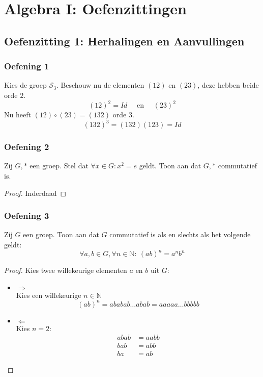 \documentclass[main.tex]{subfiles}
\begin{document}
\chapter{Algebra I: Oefenzittingen}
\label{cha:algebra-i-oefenzittingen}

\section{Oefenzitting 1: Herhalingen en Aanvullingen}
\subsection*{Oefening 1}
\label{oza:oz1-oef1}
Kies de groep $\mathcal{S}_{3}$.
Beschouw nu de elementen $(12)$ en $(23)$, deze hebben beide orde $2$.
\[ (12)^{2} = Id \quad\text{ en }\quad (23)^{2} \]
Nu heeft $(12) \circ (23) = (132)$ orde $3$.
\[ (132)^{3} = (132)(123) = Id \]

\subsection*{Oefening 2}
\label{oza:oz1-oef2}
Zij $G,*$ een groep.
Stel dat $\forall x \in G: x^{2} = e$ geldt.
Toon aan dat $G,*$ commutatief is.

\begin{proof}
  Inderdaad
\end{proof}

\subsection*{Oefening 3}
\label{oza:oz1-oef3}
Zij $G$ een groep.
Toon aan dat $G$ commutatief is als en slechts als het volgende geldt:
\[ \forall a,b \in G, \forall n \in \mathbb{N}:\ (ab)^{n} = a^{n}b^{n} \]

\begin{proof}
  Kies twee willekeurige elementen $a$ en $b$ uit $G$:
  \begin{itemize}
  \item $\Rightarrow$\\
    Kies een willekeurige $n\in \mathbb{N}$
    \[ (ab)^{n} = ababab \ldots abab = aaaaa \ldots bbbbb \]
  \item $\Leftarrow$\\
    Kies $n=2$:
    \[ 
    \begin{array}{rl}
       abab &= aabb\\
       bab &= abb\\
       ba &= ab
    \end{array}
    \]
  \end{itemize}
\end{proof}
\end{document}
